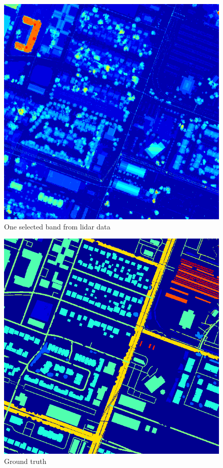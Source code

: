 \documentclass{article}[11pt]
\begin{document}
\begin{figure}
  \includegraphics[width=\linewidth]{lidar4.png}
  \caption{One selected band from lidar data}
\end{figure}

\begin{figure}
  \includegraphics[width=\linewidth]{Ground_Truth.png}
  \caption{Ground truth}
\end{figure}
\end{document}
